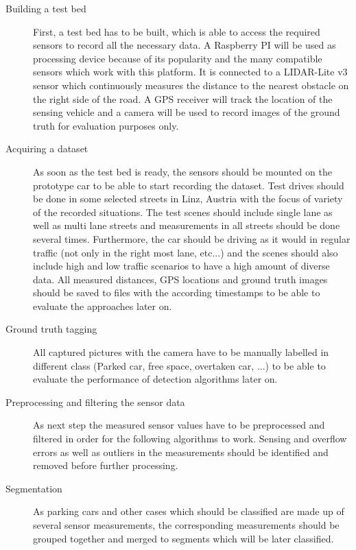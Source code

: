 \begin{description}

\item[Building a test bed] First, a test bed has to be built, which is able to access the required sensors to record all the necessary data. A Raspberry PI will be used as processing device because of its popularity and the many compatible sensors which work with this platform. It is connected to a LIDAR-Lite v3 sensor which continuously measures the distance to the nearest obstacle on the right side of the road. A GPS receiver will track the location of the sensing vehicle and a camera will be used to record images of the ground truth for evaluation purposes only. 

\item[Acquiring a dataset] As soon as the test bed is ready, the sensors should be mounted on the prototype car to be able to start recording the dataset. Test drives should be done in some selected streets in Linz, Austria with the focus of variety of the recorded situations. The test scenes should include single lane as well as multi lane streets and measurements in all streets should be done several times. Furthermore, the car should be driving as it would in regular traffic (not only in the right most lane, etc...) and the scenes should also include high and low traffic scenarios to have a high amount of diverse data. All measured distances, GPS locations and ground truth images should be saved to files with the according timestamps to be able to evaluate the approaches later on.

\item[Ground truth tagging] All captured pictures with the camera have to be manually labelled in different class (Parked car, free space, overtaken car, ...) to be able to evaluate the performance of detection algorithms later on.

\item[Preprocessing and filtering the sensor data] As next step the measured sensor values have to be preprocessed and filtered in order for the following algorithms to work. Sensing and overflow errors as well as outliers in the measurements should be identified and removed before further processing.

\item[Segmentation] As parking cars and other cases which should be classified are made up of several sensor measurements, the corresponding measurements should be grouped together and merged to segments which will be later classified.


\end{description}
